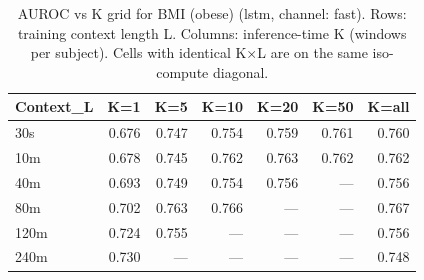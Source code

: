 \begin{table}[ht]
\centering
\caption{AUROC vs K grid for BMI (obese) (lstm, channel: fast). Rows: training context length L. Columns: inference-time K (windows per subject). Cells with identical K×L are on the same iso-compute diagonal.}
\label{tab:kgrid_bmi_binary_lstm_fast}
\begin{tabular}{lrrrrrr}
\toprule
Context_L & K=1 & K=5 & K=10 & K=20 & K=50 & K=all \\
\midrule
30s & 0.676 & 0.747 & 0.754 & 0.759 & 0.761 & 0.760 \\
10m & 0.678 & 0.745 & 0.762 & 0.763 & 0.762 & 0.762 \\
40m & 0.693 & 0.749 & 0.754 & 0.756 & — & 0.756 \\
80m & 0.702 & 0.763 & 0.766 & — & — & 0.767 \\
120m & 0.724 & 0.755 & — & — & — & 0.756 \\
240m & 0.730 & — & — & — & — & 0.748 \\
\bottomrule
\end{tabular}
\end{table}